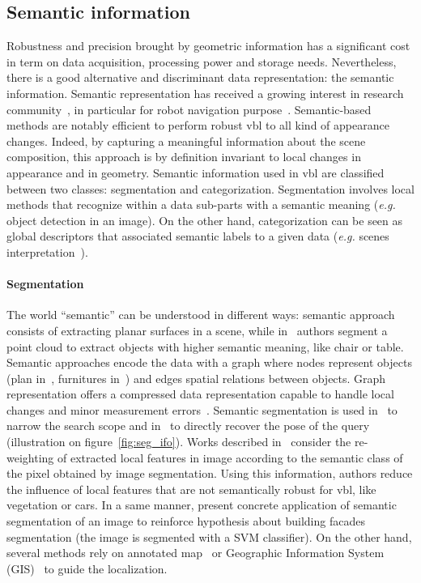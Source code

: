 	\subsection{Semantic information}
		\label{subsec:semantic_info}
		Robustness and precision brought by geometric information has a significant cost in term on data acquisition, processing power and storage needs. Nevertheless, there is a good alternative and discriminant data representation: the semantic information. Semantic representation has received a growing interest in research community~\citep{Liu2016a}, in particular for robot navigation purpose~\citep{Kostavelis2015}. Semantic-based methods are notably efficient to perform robust \ac{vbl} to all kind of appearance changes. Indeed, by capturing a meaningful information about the scene composition, this approach is by definition invariant to local changes in appearance and in geometry. Semantic information used in \ac{vbl} are classified between two classes: segmentation and categorization. Segmentation involves local methods that recognize within a data sub-parts with a semantic meaning (\textit{e.g.} object detection in an image). On the other hand, categorization can be seen as global descriptors that associated semantic labels to a given data (\textit{e.g.} scenes interpretation~\citep{Deng2009}).
		
		\paragraph{Segmentation}
			The world ``semantic'' can be understood in different ways: \citet{Fernandez-Moral2013} semantic approach consists of extracting planar surfaces in a scene, while in~\citep{Salas-Moreno2013} authors segment a point cloud to extract objects with higher semantic meaning, like chair or table. Semantic approaches encode the data with a graph where nodes represent objects (plan in~\citep{Fernandez-Moral2013}, furnitures in~\citep{Salas-Moreno2013}) and edges spatial relations between objects. Graph representation offers a compressed data representation capable to handle local changes and minor measurement errors~\citep{Stumm2015}. Semantic segmentation is used in~\citep{Lu2015} to narrow the search scope and in~\citep{Ardeshir2014,Castaldo2015,Christie2016} to directly recover the pose of the query (illustration on figure~\ref{fig:seg_ifo}). Works described in~\citep{Arandjelovic2014a,Mousavian2015} consider the re-weighting of extracted local features in image according to the semantic class of the pixel obtained by image segmentation. Using this information, authors reduce the influence of local features that are not semantically robust for \ac{vbl}, like vegetation or cars. In a same manner, \citet{Arth2015} present concrete application of semantic segmentation of an image to reinforce hypothesis about building facades segmentation (the image is segmented with a SVM classifier). On the other hand, several methods rely on annotated map~\citep{Atanasov2016,Wang2015} or Geographic Information System (GIS)~\citep{Ardeshir2014,Castaldo2015,Qu2015} to guide the localization.
	    	
